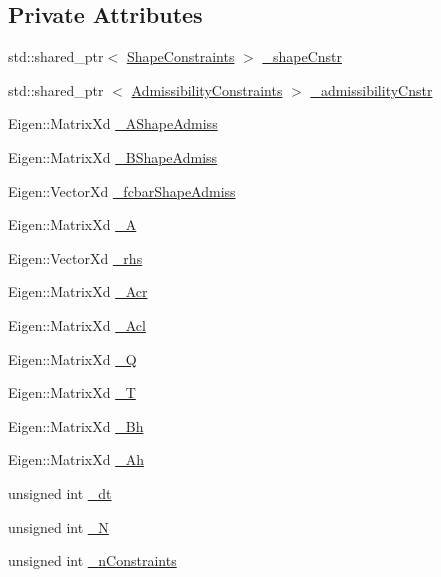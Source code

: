 \subsection*{\-Private \-Attributes}
\begin{DoxyCompactItemize}
\item 
std\-::shared\-\_\-ptr$<$ \hyperlink{classShapeConstraints}{\-Shape\-Constraints} $>$ \hyperlink{classMIQPLinearConstraints_a5c8788e52f7b0664606662cfa758ae88}{\-\_\-shape\-Cnstr}
\item 
std\-::shared\-\_\-ptr\*
$<$ \hyperlink{classAdmissibilityConstraints}{\-Admissibility\-Constraints} $>$ \hyperlink{classMIQPLinearConstraints_a1ac00fe6aca254b4dd8568e199bd20a4}{\-\_\-admissibility\-Cnstr}
\item 
\-Eigen\-::\-Matrix\-Xd \hyperlink{classMIQPLinearConstraints_a7ff7b3584cf9ff3e2124d80bd0684180}{\-\_\-\-A\-Shape\-Admiss}
\item 
\-Eigen\-::\-Matrix\-Xd \hyperlink{classMIQPLinearConstraints_ab3ea8be40c22fa7d8035c7b5c5c1010c}{\-\_\-\-B\-Shape\-Admiss}
\item 
\-Eigen\-::\-Vector\-Xd \hyperlink{classMIQPLinearConstraints_a4e1cac634590c04e81d9b9341088efeb}{\-\_\-fcbar\-Shape\-Admiss}
\item 
\-Eigen\-::\-Matrix\-Xd \hyperlink{classMIQPLinearConstraints_a5dfdc7553c4cbbe75ac54b34c4f29732}{\-\_\-\-A}
\item 
\-Eigen\-::\-Vector\-Xd \hyperlink{classMIQPLinearConstraints_ac8df74075c393100f5bddcb371503530}{\-\_\-rhs}
\item 
\-Eigen\-::\-Matrix\-Xd \hyperlink{classMIQPLinearConstraints_a26250a3f878cdacc0fa0c5ccf04d0bed}{\-\_\-\-Acr}
\item 
\-Eigen\-::\-Matrix\-Xd \hyperlink{classMIQPLinearConstraints_a100ca667cae697cda19ae4aef3543120}{\-\_\-\-Acl}
\item 
\-Eigen\-::\-Matrix\-Xd \hyperlink{classMIQPLinearConstraints_afecaf6e02135bfba45045fab6cce3511}{\-\_\-\-Q}
\item 
\-Eigen\-::\-Matrix\-Xd \hyperlink{classMIQPLinearConstraints_a5e6d37521f3da248b19ff424526d700a}{\-\_\-\-T}
\item 
\-Eigen\-::\-Matrix\-Xd \hyperlink{classMIQPLinearConstraints_a0c0fbbb1b86c5d51a133ee661977c1f5}{\-\_\-\-Bh}
\item 
\-Eigen\-::\-Matrix\-Xd \hyperlink{classMIQPLinearConstraints_aacba15c9dfc1c8f88e253a4f75e422fd}{\-\_\-\-Ah}
\item 
unsigned int \hyperlink{classMIQPLinearConstraints_a403b0a1f684bda20236a759bd72950f2}{\-\_\-dt}
\item 
unsigned int \hyperlink{classMIQPLinearConstraints_a1edaf84d613dde3f86fd9e78aa14a077}{\-\_\-\-N}
\item 
unsigned int \hyperlink{classMIQPLinearConstraints_a2726424eb890fe556ce503096b418d0f}{\-\_\-n\-Constraints}
\end{DoxyCompactItemize}


